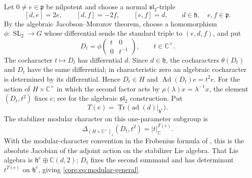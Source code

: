 \documentclass[11pt,reqno]{amsart}
\numberwithin{equation}{section}
\theoremstyle{definition}
\theoremstyle{remark}
\newcommand{\C}{\mathbb C}
\newcommand{\SL}{\operatorname{SL}}
\newcommand{\Ad}{\operatorname{Ad}}
\newcommand{\ad}{\operatorname{ad}}
\newcommand{\Tr}{\operatorname{Tr}}
\newcommand{\fh}{\mathfrak h}
\newcommand{\fp}{\mathfrak p}
\newcommand{\absC}[1]{\lvert #1\rvert_{\C}}
\begin{document}
Let $0\ne e\in\fp$ be nilpotent and choose a normal $\mathfrak{sl}_2$-triple
\begin{equation}\label{core:eq:normal-triple-general}
 [d,e]=2e,\qquad [d,f]=-2f,\qquad [e,f]=d,
 \qquad d\in\fh,\quad e,f\in\fp.
\end{equation}
By the algebraic Jacobson--Morozov theorem, choose a homomorphism
$\phi:\SL_2\to G$ whose differential sends the standard triple to
$(e,d,f)$, and put
\begin{equation}\label{core:eq:Dt-algebraic}
 D_t=\phi\!\begin{pmatrix}t&0\\0&t^{-1}\end{pmatrix},
 \qquad t\in\C^\times.
\end{equation}
The cocharacter $t\mapsto D_t$ has differential $d$.  Since
$d\in\fh$, the cocharacters $\theta(D_t)$ and $D_t$ have the same
differential; in characteristic zero an algebraic cocharacter is determined
by its differential.  Hence $D_t\in H$ and $\Ad(D_t)e=t^2e$.  For the
action of $H\times\C^\times$ in which the second factor acts by
$\rho(\lambda)x=\lambda^{-1}x$, the element $(D_t,t^2)$ fixes $e$; see
\cite[\S3.2]{CM} for the algebraic $\mathfrak{sl}_2$ construction.  Put
\begin{equation}\label{core:eq:T-of-e}
 T(e)=\Tr\bigl(\ad(d)|_{\fh^e}\bigr).
\end{equation}
The stabilizer modular character on this one-parameter subgroup is
\begin{equation}\label{core:eq:modular-general}
 \Delta_{(H\times\C^\times)_e}(D_t,t^2)=\absC{t}^{T(e)}.
\end{equation}
With the modular-character convention in the Frobenius formula of
\cite[Theorem~2.5.7]{AG09}, this is the absolute Jacobian of the adjoint
action on the stabilizer Lie algebra.  That Lie algebra is
$\fh^e\oplus\C(d,2)$; $D_t$ fixes the second summand and has determinant
$t^{T(e)}$ on $\fh^e$, giving \eqref{core:eq:modular-general}.
\end{document}
